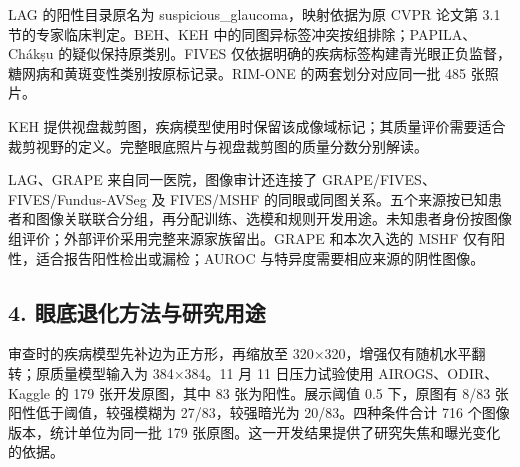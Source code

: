 \documentclass[
  10pt,
]{article}
\begin{document}
LAG 的阳性目录原名为 suspicious\_glaucoma，映射依据为原 CVPR 论文第 3.1
节的专家临床判定。BEH、KEH 中的同图异标签冲突按组排除；PAPILA、Chákṣu
的疑似保持原类别。FIVES
仅依据明确的疾病标签构建青光眼正负监督，糖网病和黄斑变性类别按原标记录。RIM-ONE
的两套划分对应同一批 485 张照片。

KEH
提供视盘裁剪图，疾病模型使用时保留该成像域标记；其质量评价需要适合裁剪视野的定义。完整眼底照片与视盘裁剪图的质量分数分别解读。

LAG、GRAPE 来自同一医院，图像审计还连接了
GRAPE/FIVES、FIVES/Fundus-AVSeg 及 FIVES/MSHF
的同眼或同图关系。五个来源按已知患者和图像关联联合分组，再分配训练、选模和规则开发用途。未知患者身份按图像组评价；外部评价采用完整来源家族留出。GRAPE
和本次入选的 MSHF 仅有阳性，适合报告阳性检出或漏检；AUROC
与特异度需要相应来源的阴性图像。

\subsection{4.
眼底退化方法与研究用途}\label{ux773cux5e95ux9000ux5316ux65b9ux6cd5ux4e0eux7814ux7a76ux7528ux9014}

审查时的疾病模型先补边为正方形，再缩放至
320×320，增强仅有随机水平翻转；原质量模型输入为 384×384。11 月 11
日压力试验使用 AIROGS、ODIR、Kaggle 的 179 张开发原图，其中 83
张为阳性。展示阈值 0.5 下，原图有 8/83 张阳性低于阈值，较强模糊为
27/83，较强暗光为 20/83。四种条件合计 716 个图像版本，统计单位为同一批
179 张原图。这一开发结果提供了研究失焦和曝光变化的依据。
\end{document}
